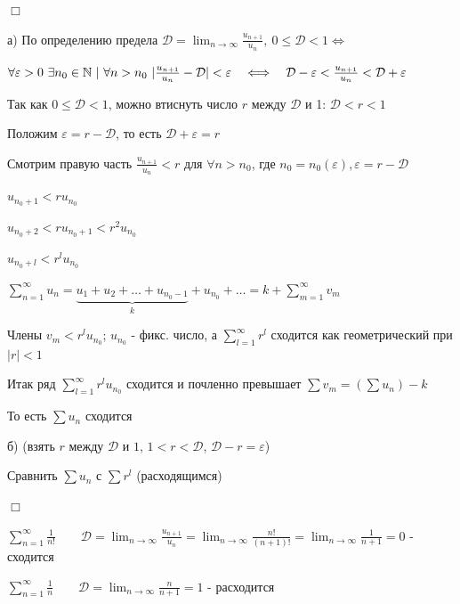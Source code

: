 \documentclass[12pt]{article}
\begin{document}
    \begin{MyProof}
        $\Box$

        а) По определению предела $\mathcal{D} = \lim_{n \to \infty} \frac{u_{n + 1}}{u_n}, \ 0 \leq \mathcal{D} < 1 \Longleftrightarrow$

        $\forall \varepsilon > 0 \ \exists n_0 \in \mathbb{N} \ | \ \forall n > n_0 \ |\frac{u_{n + 1}}{u_n} - \mathcal{D}| < \varepsilon \quad \Longleftrightarrow \quad \mathcal{D} - \varepsilon < \frac{u_{n + 1}}{u_n} < \mathcal{D} + \varepsilon$

        Так как $0 \leq \mathcal{D} < 1$, можно втиснуть число $r$ между $\mathcal{D}$ и 1: $\mathcal{D} < r < 1$

        Положим $\varepsilon = r - \mathcal{D}$, то есть $\mathcal{D} + \varepsilon = r$

        Смотрим правую часть $\frac{u_{n + 1}}{u_n} < r$ для $\forall n > n_0$, где $n_0 = n_0(\varepsilon), \varepsilon = r - \mathcal{D}$

        $u_{n_0 + 1} < r u_{n_0}$

        $u_{n_0 + 2} < r u_{n_0 + 1} < r^2 u_{n_0}$

        $u_{n_0 + l} < r^l u_{n_0}$

        $\sum_{n = 1}^\infty u_n = \underset{k}{\underbrace{u_1 + u_2 + \dots + u_{n_0 - 1}}} + u_{n_0} + \dots = k + \sum_{m = 1}^\infty v_m $ %

        Члены $v_m < r^l u_{n_0}$; $u_{n_0}$ - фикс. число, а $\sum_{l = 1}^\infty r^l$ сходится как геометрический при $|r| < 1$

        Итак ряд $\sum_{l = 1}^\infty r^l u_{n_0}$ сходится и почленно превышает $\sum v_m = \left(\sum u_n\right) - k$

        То есть $\sum u_n$ сходится

        б) \Lab (взять $r$ между $\mathcal{D}$ и $1$, $1 < r < \mathcal{D}$, $\mathcal{D} - r = \varepsilon$)

        Сравнить $\sum u_n$ с $\sum r^l$ (расходящимся)

        $\Box$
    \end{MyProof}

     $\sum_{n = 1}^\infty \frac{1}{n!} \quad\quad \mathcal{D} = \lim_{n \to \infty} \frac{u_{n + 1}}{u_n} = \lim_{n \to \infty} \frac{n!}{(n + 1)!} = \lim_{n \to \infty} \frac{1}{n + 1} = 0$ - сходится

     $\sum_{n = 1}^\infty \frac{1}{n} \quad\quad \mathcal{D} = \lim_{n \to \infty} \frac{n}{n + 1} = 1$ - расходится
\end{document}
